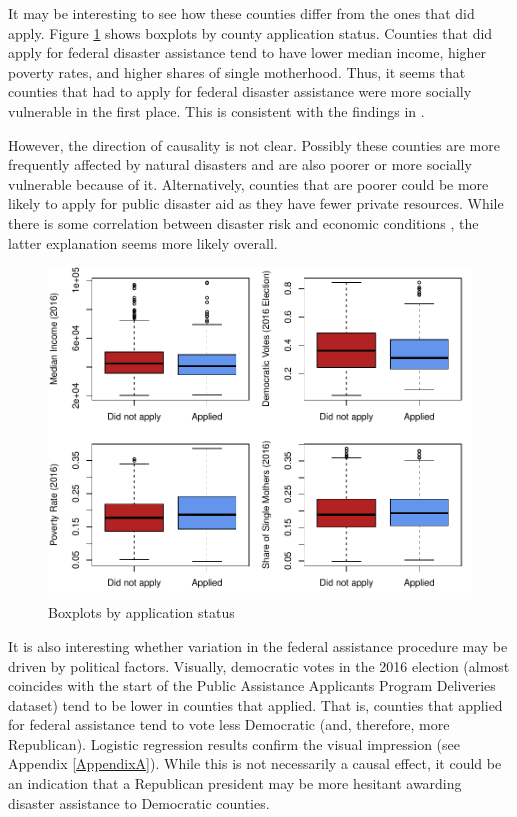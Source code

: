 

It may be interesting to see how these counties differ from the ones that did apply. Figure \ref{AssistCovBoxplot} shows boxplots by county application status. Counties that did apply for federal disaster assistance tend to have lower median income, higher poverty rates, and higher shares of single motherhood. Thus, it seems that counties that had to apply for federal disaster assistance were more socially vulnerable in the first place. This is consistent with the findings in \cite{Gao_2022}.

However, the direction of causality is not clear. Possibly these counties are more frequently affected by natural disasters and are also poorer or more socially vulnerable because of it. Alternatively, counties that are poorer could be more likely to apply for public disaster aid as they have fewer private resources. While there is some correlation between disaster risk and economic conditions \citep[for example][]{Goodman_2020}, the latter explanation seems more likely overall.

\begin{figure}[!h]
	\centering
	\includegraphics[scale=1]{"../Code & Data/AssistanceCovBoxplot.pdf"}
	\caption{Boxplots by application status}
	\label{AssistCovBoxplot}
\end{figure}

It is also interesting whether variation in the federal assistance procedure may be driven by political factors. Visually, democratic votes in the 2016 election (almost coincides with the start of the Public Assistance Applicants Program Deliveries dataset) tend to be lower in counties that applied. That is, counties that applied for federal assistance tend to vote less Democratic (and, therefore, more Republican). Logistic regression results confirm the visual impression (see Appendix \ref{AppendixA}). While this is not necessarily a causal effect, it could be an indication that a Republican president may be more hesitant awarding disaster assistance to Democratic counties.

